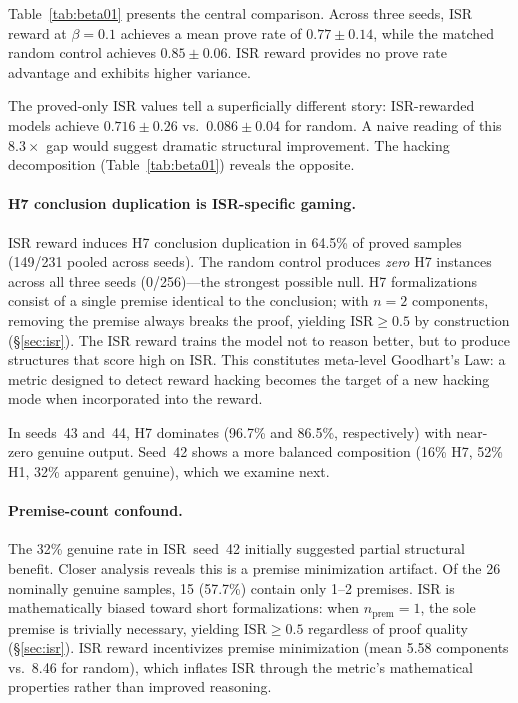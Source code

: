 Table~\ref{tab:beta01} presents the central comparison.
Across three seeds, ISR reward at $\beta{=}0.1$ achieves a mean prove rate of $0.77 \pm 0.14$, while the matched random control achieves $0.85 \pm 0.06$.
ISR reward provides no prove rate advantage and exhibits higher variance.

The proved-only ISR values tell a superficially different story: ISR-rewarded models achieve $0.716 \pm 0.26$ vs.\ $0.086 \pm 0.04$ for random.
A naive reading of this $8.3\times$ gap would suggest dramatic structural improvement.
The hacking decomposition (Table~\ref{tab:beta01}) reveals the opposite.

\paragraph{H7 conclusion duplication is ISR-specific gaming.}

ISR reward induces H7 conclusion duplication in 64.5\% of proved samples (149/231 pooled across seeds).
The random control produces \emph{zero} H7 instances across all three seeds (0/256)---the strongest possible null.
H7 formalizations consist of a single premise identical to the conclusion; with $n{=}2$ components, removing the premise always breaks the proof, yielding $\text{ISR} \geq 0.5$ by construction (\S\ref{sec:isr}).
The ISR reward trains the model not to reason better, but to produce structures that score high on ISR.
This constitutes meta-level Goodhart's Law: a metric designed to detect reward hacking becomes the target of a new hacking mode when incorporated into the reward.

In seeds~43 and~44, H7 dominates (96.7\% and 86.5\%, respectively) with near-zero genuine output.
Seed~42 shows a more balanced composition (16\% H7, 52\% H1, 32\% apparent genuine), which we examine next.

\paragraph{Premise-count confound.}

The 32\% genuine rate in ISR~seed~42 initially suggested partial structural benefit.
Closer analysis reveals this is a premise minimization artifact.
Of the 26 nominally genuine samples, 15 (57.7\%) contain only 1--2 premises.
ISR is mathematically biased toward short formalizations: when $n_{\text{prem}}{=}1$, the sole premise is trivially necessary, yielding $\text{ISR} \geq 0.5$ regardless of proof quality (\S\ref{sec:isr}).
ISR reward incentivizes premise minimization (mean 5.58 components vs.\ 8.46 for random), which inflates ISR through the metric's mathematical properties rather than improved reasoning.

